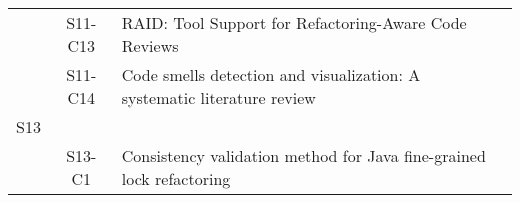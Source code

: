\begin{longtable}{ccp{9cm}p{3cm}}
    & S11-C13 & RAID: Tool Support for Refactoring-Aware Code Reviews                                                                                                                                                                                          & \citeauthor*{Brito2021}       \\
    & S11-C14 & Code smells detection and visualization: A systematic literature review                                                                                                                                                                        & \citeauthor*{Pereira2022}     \\
S13 &        &                                                                                                                                                                                                                                               &                                 \\
    & S13-C1  & Consistency validation method for Java fine-grained lock refactoring                                                                                                                                                                           & \citeauthor*{Zhang2021b}         
\end{longtable}
\FloatBarrier